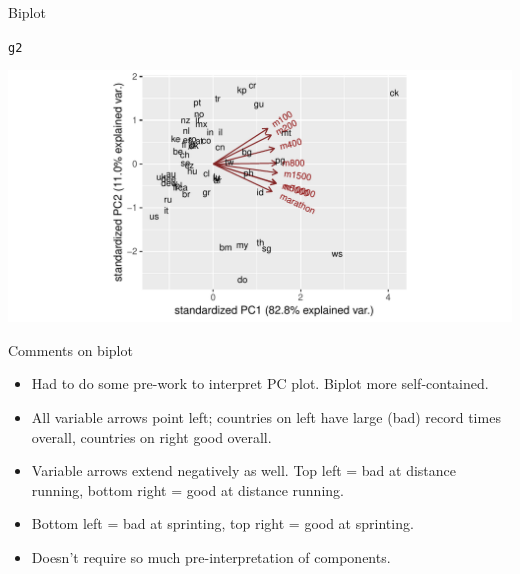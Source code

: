 \documentclass[unknownkeysallowed]{beamer}\usepackage[]{graphicx}\usepackage[]{color}
\makeatletter
\def\maxwidth{ %
  \ifdim\Gin@nat@width>\linewidth
    \linewidth
  \else
    \Gin@nat@width
  \fi
}
\newcommand{\hlstd}[1]{\textcolor[rgb]{0.345,0.345,0.345}{#1}}%
\newenvironment{kframe}{%
 \def\at@end@of@kframe{}%
 \ifinner\ifhmode%
  \def\at@end@of@kframe{\end{minipage}}%
  \begin{minipage}{\columnwidth}%
 \fi\fi%
 \def\FrameCommand##1{\hskip\@totalleftmargin \hskip-\fboxsep
 \colorbox{shadecolor}{##1}\hskip-\fboxsep
     \hskip-\linewidth \hskip-\@totalleftmargin \hskip\columnwidth}%
 \MakeFramed {\advance\hsize-\width
   \@totalleftmargin\z@ \linewidth\hsize
   \@setminipage}}%
 {\par\unskip\endMakeFramed%
 \at@end@of@kframe}
\newenvironment{knitrout}{}{} %
\makeatother
\begin{document}
\begin{frame}{Biplot}

\begin{knitrout}
\color{fgcolor}\begin{kframe}
\begin{alltt}
\hlstd{g2}
\end{alltt}
\end{kframe}
\includegraphics[width=\maxwidth]{figure/biplot2-1} 

\end{knitrout}

  
\end{frame}

\begin{frame}{Comments on biplot}
  
  \begin{itemize}
  \item Had to do some pre-work to interpret PC plot. Biplot more self-contained.
  \item All variable arrows point left; countries on left have large
    (bad) record times overall, countries on right good overall.
  \item Variable arrows extend negatively as well. Top left = bad at
    distance running, bottom right = good at distance running.
  \item Bottom left = bad at sprinting, top right = good at
    sprinting.
  \item Doesn't require so much pre-interpretation of components.
  \end{itemize}
  
\end{frame}
\end{document}
